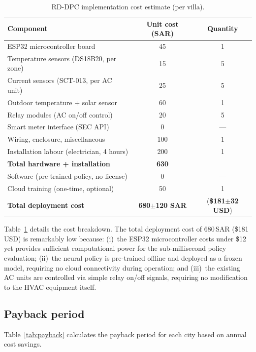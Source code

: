 \documentclass[12pt]{article}
\theoremstyle{plain}
\theoremstyle{definition}
\begin{document}
\begin{table}[H]
\centering
\caption{RD-DPC implementation cost estimate (per villa).}\label{tab:impl_cost}
\begin{tabular*}{\textwidth}{@{\extracolsep{\fill}}lcc}
\toprule
Component & Unit cost (SAR) & Quantity \\
\midrule
ESP32 microcontroller board & 45 & 1 \\
Temperature sensors (DS18B20, per zone) & 15 & 5 \\
Current sensors (SCT-013, per AC unit) & 25 & 5 \\
Outdoor temperature + solar sensor & 60 & 1 \\
Relay modules (AC on/off control) & 20 & 5 \\
Smart meter interface (SEC API) & 0 & --- \\
Wiring, enclosure, miscellaneous & 100 & 1 \\
Installation labour (electrician, 4 hours) & 200 & 1 \\
\midrule
\textbf{Total hardware + installation} & \textbf{630} & \\
\midrule
Software (pre-trained policy, no license) & 0 & --- \\
Cloud training (one-time, optional) & 50 & 1 \\
\midrule
\textbf{Total deployment cost} & \textbf{680$\pm$120 SAR} & (\textbf{\$181$\pm$32 USD}) \\
\bottomrule
\end{tabular*}
\end{table}

Table~\ref{tab:impl_cost} details the cost breakdown. The total deployment cost of 680\,SAR (\$181\,USD) is remarkably low because: (i)~the ESP32 microcontroller costs under \$12 yet provides sufficient computational power for the sub-millisecond policy evaluation; (ii)~the neural policy is pre-trained offline and deployed as a frozen model, requiring no cloud connectivity during operation; and (iii)~the existing AC units are controlled via simple relay on/off signals, requiring no modification to the HVAC equipment itself.

\subsection{Payback period}

Table~\ref{tab:payback} calculates the payback period for each city based on annual cost savings.
\end{document}
